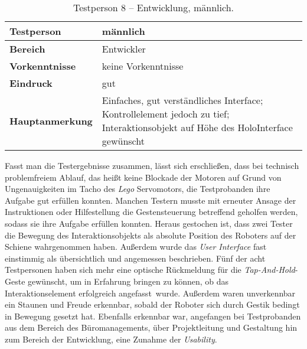 \begin{table}[H]
	
	\centering
	\begin{tabular}{|l|p{8cm}|}
		\hline
		\textbf{Testperson} & männlich  \\
		\hline
		\textbf{Bereich} & Entwickler \\
		\hline
		\textbf{Vorkenntnisse} & keine Vorkenntnisse \\
		\hline
		\textbf{Eindruck} & gut \\
		\hline
		\textbf{Hauptanmerkung} & Einfaches, gut verständliches Interface; Kontrollelement jedoch zu tief; Interaktionsobjekt auf Höhe des HoloInterface gewünscht\\
		\hline
	\end{tabular}
	\caption{Testperson 8 -- Entwicklung, männlich.}
	\label{tab:scoreDevelopment2}
\end{table}
Fasst man die Testergebnisse zusammen, lässt sich erschließen, dass bei technisch problemfreiem Ablauf, das heißt keine Blockade der Motoren auf Grund von Ungenauigkeiten im Tacho des \textit{Lego} Servomotors, die Testprobanden ihre Aufgabe gut erfüllen konnten. Manchen Testern musste mit erneuter Ansage der Instruktionen oder Hilfestellung die Gestensteuerung betreffend geholfen werden, sodass sie ihre Aufgabe erfüllen konnten. Heraus gestochen ist, dass zwei Tester die Bewegung des Interaktionsobjekts als absolute Position des Roboters auf der Schiene wahrgenommen haben. Außerdem wurde das \textit{User Interface} fast einstimmig als übersichtlich und angemessen beschrieben. Fünf der acht Testpersonen haben sich mehr eine optische Rückmeldung für die \textit{Tap-And-Hold}-Geste gewünscht, um in Erfahrung bringen zu können, ob das Interaktionselement erfolgreich \frqq angefasst\flqq\ wurde. Außerdem waren unverkennbar ein Staunen und Freude erkennbar, sobald der Roboter sich durch Gestik bedingt in Bewegung gesetzt hat. Ebenfalls erkennbar war, angefangen bei Testprobanden aus dem Bereich des Büromanagements, über Projektleitung und Gestaltung hin zum Bereich der Entwicklung, eine Zunahme der \textit{Usability}. 